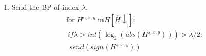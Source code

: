 \begin{enumerate}
\begin{enumerate}
  \item Send the BP of index $\lambda$.
    \begin{equation}
      \begin{array}{l}
        \text{for~}H^{s,x,y}\text{~in} H[\hat{H}\downarrow]: \\
        ~ if \lambda > int(\log_2(abs(H^{s,x,y}))) > \lambda/2: \\
        ~~ send(sign(H^{s,x,y}))\\
        ~ 
      \end{array}
    \end{equation}
  \end{enumerate}
\end{enumerate}

  

